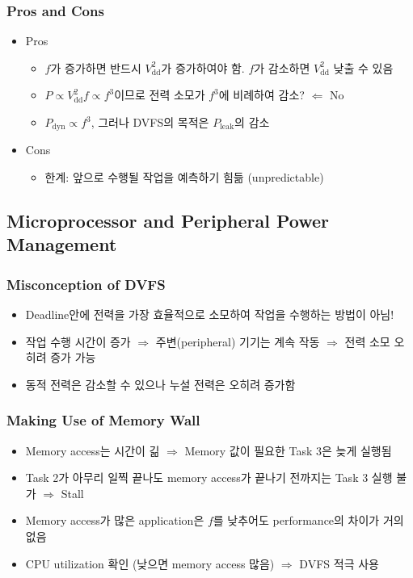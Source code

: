 \subsubsection*{Pros and Cons}
\begin{itemize}
    \item Pros
    \begin{itemize}
        \item $f$가 증가하면 반드시 $V_\mathrm{dd}^2$가 증가하여야 함. $f$가 감소하면 $V_\mathrm{dd}^2$ 낮출 수 있음
        \item $P \varpropto V_\mathrm{dd}^2 f \varpropto f^3$이므로 전력 소모가 $f^3$에 비례하여 감소? $\Leftarrow$ No
        \item $P_{\mathrm{dyn}} \varpropto f^3$, 그러나 DVFS의 목적은 $P_{\mathrm{leak}}$의 감소
    \end{itemize}
    \item Cons
    \begin{itemize}
        \item 한계: 앞으로 수행될 작업을 예측하기 힘듦 (unpredictable)
    \end{itemize}
\end{itemize}

\subsection{Microprocessor and Peripheral Power Management}

\subsubsection*{Misconception of DVFS}
\begin{itemize}
    \item Deadline안에 전력을 가장 효율적으로 소모하여 작업을 수행하는 방법이 아님!
    \item 작업 수행 시간이 증가 $\Rightarrow$ 주변(peripheral) 기기는 계속 작동 $\Rightarrow$ 전력 소모 오히려 증가 가능
    \item 동적 전력은 감소할 수 있으나 누설 전력은 오히려 증가함
\end{itemize}

\subsubsection*{Making Use of Memory Wall}
\begin{itemize}
    \item Memory access는 시간이 긺 $\Rightarrow$ Memory 값이 필요한 Task 3은 늦게 실행됨
    \item Task 2가 아무리 일찍 끝나도 memory access가 끝나기 전까지는 Task 3 실행 불가 $\Rightarrow$ Stall
    \item Memory access가 많은 application은 $f$를 낮추어도 performance의 차이가 거의 없음
    \item CPU utilization 확인 (낮으면 memory access 많음) $\Rightarrow$ DVFS 적극 사용
\end{itemize}

